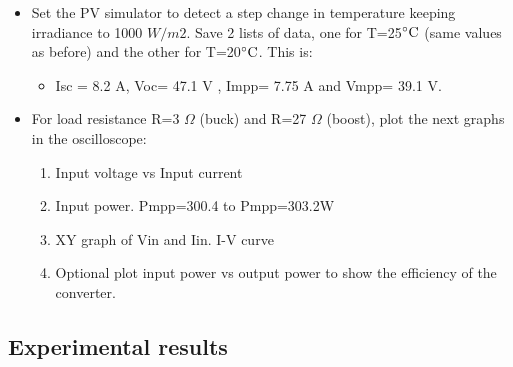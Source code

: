 \begin{itemize}
  \item Set the PV simulator to detect a step change in temperature keeping irradiance to 1000 $W /m2$.
  Save 2 lists of data, one for T=25$\decC$ (same values as before) and the other for T=20$\decC$. This is:
  \begin{itemize}
  	\item Isc = 8.2 A, Voc= 47.1 V , Impp= 7.75 A and Vmpp= 39.1 V.
  \end{itemize} 

  \item For load resistance R=3 $\Omega$ (buck) and R=27 $\Omega$ (boost), plot the next graphs in the oscilloscope:
  \begin{enumerate}
  	\item Input voltage vs Input current 
  	\item Input power. Pmpp=300.4 to  Pmpp=303.2W
  	\item XY graph of Vin and Iin. I-V curve
  	\item Optional plot input power vs output power to show the efficiency of the converter.
  \end{enumerate}
  
  
\end{itemize}
	
\subsection{Experimental results}